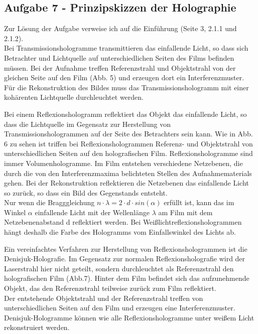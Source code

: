 \subsection*{Aufgabe 7 - Prinzipskizzen der Holographie}
Zur Lösung der Aufgabe verweise ich auf die Einführung (Seite 3, 2.1.1 und 2.1.2). \\
Bei Transmissionshologramme transmittieren das einfallende Licht, so dass sich Betrachter und Lichtquelle auf unterschiedlichen Seiten des Films befinden müssen. Bei der Aufnahme treffen Referenzstrahl und Objektstrahl von der gleichen Seite auf den Film (Abb. 5) und erzeugen dort ein Interferenzmuster. Für die Rekonstruktion des Bildes muss das Transmissionshologramm mit einer kohärenten Lichtquelle durchleuchtet werden.


Bei einem Reflexionshologramm reflektiert das Objekt das einfallende Licht, so dass die Lichtquelle im Gegensatz zur Herstellung von Transmissionshologrammen auf der Seite des Betrachters sein kann. Wie in Abb. 6 zu sehen ist triffen bei Reflexionshologrammen Referenz- und Objektstrahl von unterschiedlichen Seiten auf den holografischen Film. Reflexionshologramme sind immer Volumenhologramme. Im Film entstehen verschiedene Netzebenen, die durch die von den Interferenzmaxima belichteten Stellen des Aufnahmematerials gehen. Bei der Rekonstruktion reflektieren die Netzebenen das einfallende Licht so zurück, so dass ein Bild des Gegenstands entsteht.\\
Nur wenn die Bragggleichung $n \cdot \lambda = 2 \cdot d \cdot sin \left( \alpha \right)$ erfüllt ist, kann das im Winkel $\alpha$ einfallende Licht mit der Wellenlänge $\lambda$ am Film mit dem Netzebenenabstand d reflektiert werden. Bei Weißlichtreflexionshologrammen hängt deshalb die Farbe des Hologramms vom Einfallswinkel des Lichts ab.


Ein vereinfachtes Verfahren zur Herstellung von Reflexionshologrammen ist die Denisjuk-Holografie. Im Gegensatz zur normalen Reflexionsholografie wird der Laserstrahl hier nicht geteilt, sondern durchleuchtet als Referenzstrahl den holografischen Film (Abb.7).
Hinter dem Film befindet sich das aufzunehmende Objekt, das den Referenzstrahl teilweise zurück zum Film reflektiert.\\
Der entstehende Objektstrahl und der Referenzstrahl treffen von unterschiedlichen Seiten auf den Film und erzeugen eine Interferenzmuster. Denisjuk-Hologramme können wie alle Reflexionshologramme unter weißem Licht rekonstruiert werden.

